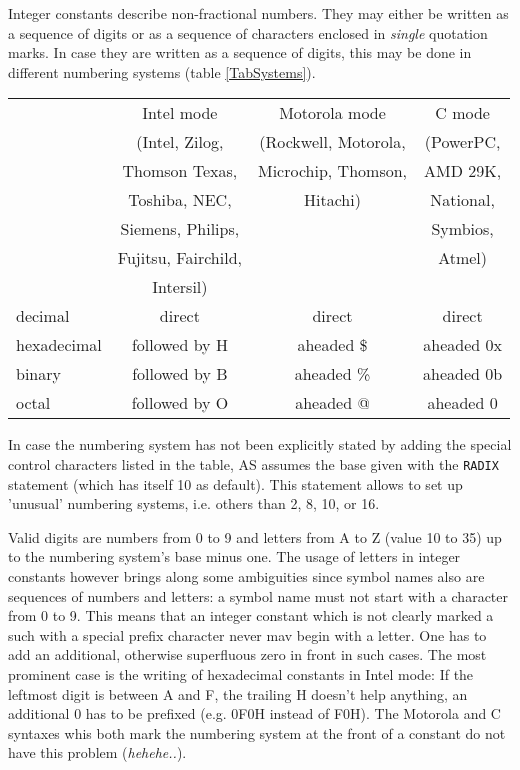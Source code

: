 \documentclass[12pt,twoside]{report}
\newcommand{\ii}[1]{{\it #1}}
\begin{document}
Integer constants describe non-fractional numbers.  They may either be
written as a sequence of digits or as a sequence of characters enclosed in
{\em single} quotation marks.  In case they are written as a sequence of
digits, this may be done in different numbering systems (table
\ref{TabSystems}).
\par
\begin{table*}[htb]
\begin{center}\begin{tabular}{|l|c|c|c|}
\hline
                & Intel mode        &  Motorola mode       &  C mode    \\
                & (Intel, Zilog,    & (Rockwell, Motorola, &  (PowerPC, \\
                &  Thomson Texas,   & Microchip, Thomson,  &  AMD 29K,  \\
                &  Toshiba, NEC,    & Hitachi)             &  National, \\
                &  Siemens, Philips, &                     &  Symbios,  \\
                & Fujitsu, Fairchild, &                    &  Atmel)    \\
                & Intersil)         &                      &            \\
\hline
\hline
decimal         & direct              & direct         &   direct \\
hexadecimal     & followed by H       & aheaded \$     & aheaded 0x \\
binary          & followed by B       & aheaded \%     & aheaded 0b \\
octal           & followed by O       & aheaded @      & aheaded 0 \\
\hline
\end{tabular}\end{center}
\caption{Possible Numbering Systems\label{TabSystems}}
\end{table*}
In case the numbering system has not been explicitly stated by adding the
special control characters listed in the table, AS assumes the base given
with the {\tt RADIX} statement (which has itself 10 as default).  This
statement allows to set up 'unusual' numbering systems, i.e. others than
2, 8, 10, or 16.

Valid digits are numbers from 0 to 9 and letters from A to Z (value 10 to
35) up to the numbering system's base minus one. The usage of letters in
integer constants however brings along some ambiguities since symbol names
also are sequences of numbers and letters: a symbol name must not start
with a character from 0 to 9.  This means that an integer constant which
is not clearly marked a such with a special prefix character never mav
begin with a letter.  One has to add an additional, otherwise superfluous
zero in front in such cases.  The most prominent case is the writing of
hexadecimal constants in Intel mode:  If the leftmost digit is between A
and F, the trailing H doesn't help anything, an additional 0 has to be
prefixed (e.g. 0F0H instead of F0H).  The Motorola and C syntaxes whis
both mark the numbering system at the front of a constant do not have this
problem (\ii{hehehe..}).
\end{document}
